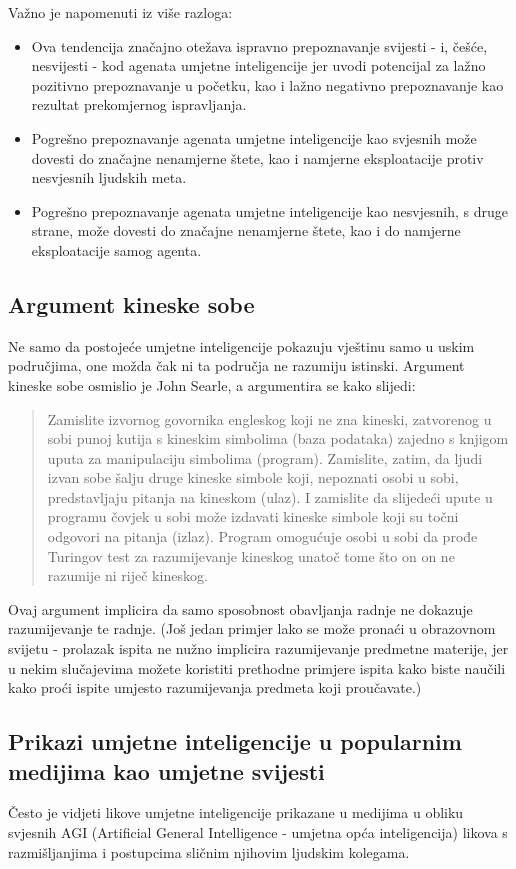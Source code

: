 \documentclass[diplomskirad]{fer}
\begin{document}
Važno je napomenuti iz više razloga:
\begin{itemize}
\item Ova tendencija značajno otežava ispravno prepoznavanje svijesti - i, češće, nesvijesti - kod agenata umjetne inteligencije jer uvodi potencijal za lažno pozitivno prepoznavanje u početku, kao i lažno negativno prepoznavanje kao rezultat prekomjernog ispravljanja.
\item Pogrešno prepoznavanje agenata umjetne inteligencije kao svjesnih može dovesti do značajne nenamjerne štete, kao i namjerne eksploatacije protiv nesvjesnih ljudskih meta.
\item Pogrešno prepoznavanje agenata umjetne inteligencije kao nesvjesnih, s druge strane, može dovesti do značajne nenamjerne štete, kao i do namjerne eksploatacije samog agenta.
\end{itemize}

\subsection{Argument kineske sobe}
Ne samo da postojeće umjetne inteligencije pokazuju vještinu samo u uskim područjima, one možda čak ni ta područja ne razumiju istinski.
Argument kineske sobe osmislio je John Searle, a argumentira se kako slijedi:
\begin{quote}
Zamislite izvornog govornika engleskog koji ne zna kineski, zatvorenog u sobi punoj kutija s kineskim simbolima (baza podataka) zajedno s knjigom uputa za manipulaciju simbolima (program). Zamislite, zatim, da ljudi izvan sobe šalju druge kineske simbole koji, nepoznati osobi u sobi, predstavljaju pitanja na kineskom (ulaz). I zamislite da slijedeći upute u programu čovjek u sobi može izdavati kineske simbole koji su točni odgovori na pitanja (izlaz). Program omogućuje osobi u sobi da prođe Turingov test za razumijevanje kineskog unatoč tome što on on ne razumije ni riječ kineskog.
\cite{turing1}
\end{quote}
Ovaj argument implicira da samo sposobnost obavljanja radnje ne dokazuje razumijevanje te radnje. (Još jedan primjer lako se može pronaći u obrazovnom svijetu - prolazak ispita ne nužno implicira razumijevanje predmetne materije, jer u nekim slučajevima možete koristiti prethodne primjere ispita kako biste naučili kako proći ispite umjesto razumijevanja predmeta koji proučavate.)

\subsection{Prikazi umjetne inteligencije u popularnim medijima kao umjetne svijesti}
Često je vidjeti likove umjetne inteligencije prikazane u medijima u obliku svjesnih AGI (Artificial General Intelligence - umjetna opća inteligencija) likova s razmišljanjima i postupcima sličnim njihovim ljudskim kolegama.
\end{document}
